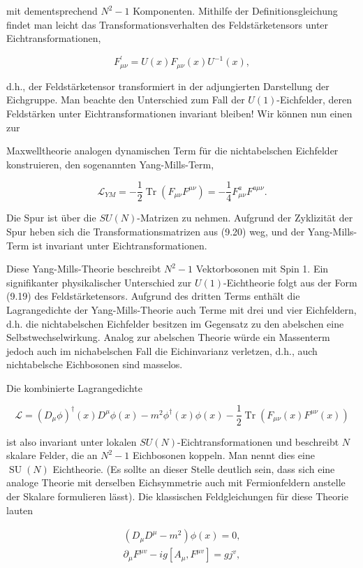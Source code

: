 \documentclass[10pt, letterpaper]{article}
\begin{document}
mit dementsprechend $N^{2}-1$ Komponenten. Mithilfe der Definitionsgleichung findet man leicht das Transformationsverhalten des Feldstärketensors unter Eichtransformationen,

$$
F_{\mu \nu}^{\prime}=U(x) F_{\mu \nu}(x) U^{-1}(x),
$$

d.h., der Feldstärketensor transformiert in der adjungierten Darstellung der Eichgruppe. Man beachte den Unterschied zum Fall der $U(1)$-Eichfelder, deren Feldstärken unter Eichtransformationen invariant bleiben! Wir können nun einen zur

Maxwelltheorie analogen dynamischen Term für die nichtabelschen Eichfelder konstruieren, den sogenannten Yang-Mills-Term,

$$
\mathscr{L}_{Y M}=-\frac{1}{2} \operatorname{Tr}\left(F_{\mu \nu} F^{\mu \nu}\right)=-\frac{1}{4} F_{\mu \nu}^{a} F^{a \mu \nu} .
$$

Die Spur ist über die $S U(N)$-Matrizen zu nehmen. Aufgrund der Zyklizität der Spur heben sich die Transformationsmatrizen aus (9.20) weg, und der Yang-Mills-Term ist invariant unter Eichtransformationen.

Diese Yang-Mills-Theorie beschreibt $N^{2}-1$ Vektorbosonen mit Spin 1. Ein signifikanter physikalischer Unterschied zur $U(1)$-Eichtheorie folgt aus der Form (9.19) des Feldstärketensors. Aufgrund des dritten Terms enthält die Lagrangedichte der Yang-Mills-Theorie auch Terme mit drei und vier Eichfeldern, d.h. die nichtabelschen Eichfelder besitzen im Gegensatz zu den abelschen eine Selbstwechselwirkung. Analog zur abelschen Theorie würde ein Massenterm jedoch auch im nichabelschen Fall die Eichinvarianz verletzen, d.h., auch nichtabelsche Eichbosonen sind masselos.

Die kombinierte Lagrangedichte

$$
\mathscr{L}=\left(D_{\mu} \phi\right)^{\dagger}(x) D^{\mu} \phi(x)-m^{2} \phi^{\dagger}(x) \phi(x)-\frac{1}{2} \operatorname{Tr}\left(F_{\mu \nu}(x) F^{\mu \nu}(x)\right)
$$

ist also invariant unter lokalen $S U(N)$-Eichtransformationen und beschreibt $N$ skalare Felder, die an $N^{2}-1$ Eichbosonen koppeln. Man nennt dies eine $\operatorname{SU}(N)$ Eichtheorie. (Es sollte an dieser Stelle deutlich sein, dass sich eine analoge Theorie mit derselben Eichsymmetrie auch mit Fermionfeldern anstelle der Skalare formulieren lässt). Die klassischen Feldgleichungen für diese Theorie lauten

$$
\begin{array}{r}
\left(D_{\mu} D^{\mu}-m^{2}\right) \phi(x)=0, \\
\partial_{\mu} F^{\mu v}-i g\left[A_{\mu}, F^{\mu v}\right]=g j^{v},
\end{array}
$$
\end{document}
